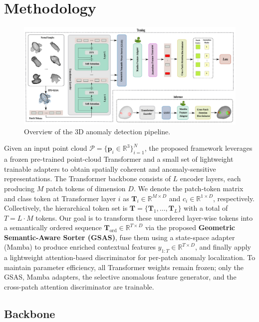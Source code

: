 \section{Methodology}

\begin{figure}[h!]
  \centering 
    \includegraphics[width=0.98\linewidth]{figs/overview}
  \caption{Overview of the 3D anomaly detection pipeline.}
  \label{fig:overview}
\end{figure}

Given an input point cloud \(\mathcal{P} = \{\mathbf{p}_i \in \mathbb{R}^3\}_{i=1}^N\), the proposed framework leverages a frozen pre-trained point-cloud Transformer and a small set of lightweight trainable adapters to obtain spatially coherent and anomaly-sensitive representations. The Transformer backbone consists of \(L\) encoder layers, each producing \(M\) patch tokens of dimension \(D\). We denote the patch-token matrix and class token at Transformer layer \(i\) as \(\mathbf{T}_i \in \mathbb{R}^{M\times D}\) and \(c_i \in \mathbb{R}^{1\times D}\), respectively. Collectively, the hierarchical token set is \(\mathbf{T} = \{\mathbf{T}_1, \dots, \mathbf{T}_L\}\) with a total of \(T = L\cdot M\) tokens. Our goal is to transform these unordered layer-wise tokens into a semantically ordered sequence \(\mathbf{T}_{\mathrm{ord}}\in\mathbb{R}^{T\times D}\) via the proposed \textbf{Geometric Semantic-Aware Sorter (GSAS)}, fuse them using a state-space adapter (Mamba) to produce enriched contextual features \(y_{1:T}\in\mathbb{R}^{T\times D}\), and finally apply a lightweight attention-based discriminator for per-patch anomaly localization. To maintain parameter efficiency, all Transformer weights remain frozen; only the GSAS, Mamba adapters, the selective anomalous feature generator, and the cross-patch attention discriminator are trainable.

\subsection{Backbone}

